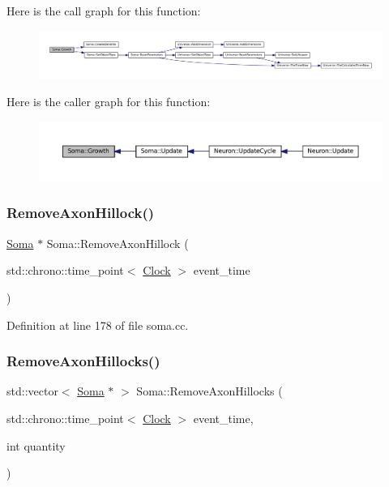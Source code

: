 Here is the call graph for this function\+:\nopagebreak
\begin{figure}[H]
\begin{center}
\leavevmode
\includegraphics[width=350pt]{class_soma_aa6162ca8a98a14cf49ba8310db129d47_cgraph}
\end{center}
\end{figure}
Here is the caller graph for this function\+:\nopagebreak
\begin{figure}[H]
\begin{center}
\leavevmode
\includegraphics[width=350pt]{class_soma_aa6162ca8a98a14cf49ba8310db129d47_icgraph}
\end{center}
\end{figure}
\mbox{\label{class_soma_a2f75c0f716fa1f74f70697db9dfcd562}} 
\subsubsection{\texorpdfstring{Remove\+Axon\+Hillock()}{RemoveAxonHillock()}}
{\footnotesize\ttfamily \mbox{\hyperlink{class_soma}{Soma}} $\ast$ Soma\+::\+Remove\+Axon\+Hillock (\begin{DoxyParamCaption}\item[{std\+::chrono\+::time\+\_\+point$<$ \mbox{\hyperlink{universe_8h_a0ef8d951d1ca5ab3cfaf7ab4c7a6fd80}{Clock}} $>$}]{event\+\_\+time }\end{DoxyParamCaption})}



Definition at line 178 of file soma.\+cc.

\mbox{\label{class_soma_a7281585d74015a2549a19df6cb16e3fb}} 
\subsubsection{\texorpdfstring{Remove\+Axon\+Hillocks()}{RemoveAxonHillocks()}}
{\footnotesize\ttfamily std\+::vector$<$ \mbox{\hyperlink{class_soma}{Soma}} $\ast$ $>$ Soma\+::\+Remove\+Axon\+Hillocks (\begin{DoxyParamCaption}\item[{std\+::chrono\+::time\+\_\+point$<$ \mbox{\hyperlink{universe_8h_a0ef8d951d1ca5ab3cfaf7ab4c7a6fd80}{Clock}} $>$}]{event\+\_\+time,  }\item[{int}]{quantity }\end{DoxyParamCaption})}



